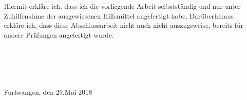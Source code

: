 
Hiermit erkläre ich, dass ich die vorliegende Arbeit selbstständig und nur unter Zuhilfenahme
der ausgewiesenen Hilfsmittel angefertigt habe. Darüberhinaus erkläre ich, dass
diese Abschlussarbeit nicht auch nicht auszugsweise, bereits für andere Prüfungen angefertigt
wurde.\\ \\ \\ \\ \\ \\
Furtwangen, den 29.Mai 2018